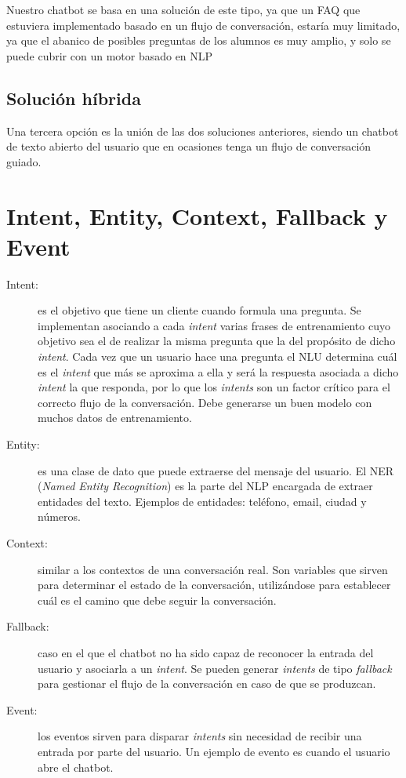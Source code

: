 Nuestro chatbot se basa en una solución de este tipo, ya que un FAQ que estuviera implementado basado en un flujo de conversación, estaría muy limitado, ya que el abanico de posibles preguntas de los alumnos es muy amplio, y solo se puede cubrir con un motor basado en NLP 


\subsection{Solución híbrida}
Una tercera opción es la unión de las dos soluciones anteriores, siendo un chatbot de texto abierto del usuario que en ocasiones tenga un flujo de conversación guiado.

\newpage

\section{Intent, Entity, Context, Fallback y Event}

\begin{description}
	\item[Intent:] es el objetivo que tiene un cliente cuando formula una pregunta. Se implementan asociando a cada \textit{intent} varias frases de entrenamiento cuyo objetivo sea el de realizar la misma pregunta que la del propósito de dicho \textit{intent}. Cada vez que un usuario hace una pregunta el NLU determina cuál es el \textit{intent} que más se aproxima a ella y será la respuesta asociada a dicho \textit{intent} la que responda, por lo que los \textit{intents} son un factor crítico para el correcto flujo de la conversación.
	Debe generarse un buen modelo con muchos datos de entrenamiento. \cite{Intents}
	\item[Entity:] es una clase de dato que puede extraerse del mensaje del usuario. El NER (\textit{Named Entity Recognition}) es la parte del NLP encargada de extraer entidades del texto. Ejemplos de entidades: teléfono, email, ciudad y números.
	\item[Context:] similar a los contextos de una conversación real. Son variables que sirven para determinar el estado de la conversación, utilizándose para establecer cuál es el camino que debe seguir la conversación. \cite{DialogflowDocs}
	\item[Fallback:] caso en el que el chatbot no ha sido capaz de reconocer la entrada del usuario y asociarla a un \textit{intent}. Se pueden generar \textit{intents} de tipo \textit{fallback} para gestionar el flujo de la conversación en caso de que se produzcan.
	\item[Event:] los eventos sirven para disparar \textit{intents} sin necesidad de recibir una entrada por parte del usuario. Un ejemplo de evento es cuando el usuario abre el chatbot.
\end{description}

